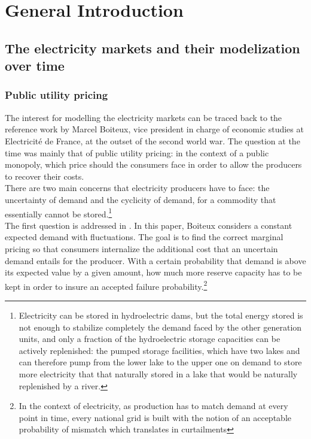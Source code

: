 \doublespacing
\section*{General Introduction}
\subsection*{The electricity markets and their modelization over time}
\subsubsection*{Public utility pricing}

The interest for modelling the electricity markets can be traced back to the reference work by Marcel Boiteux, vice president in charge of economic studies at Electricité de France, at the outset of the second world war. The question at the time was mainly that of public utility pricing: in the context of a public monopoly, which price should the consumers face in order to allow the producers to recover their costs. \\

There are two main concerns that electricity producers have to face: the uncertainty of demand and the cyclicity of demand, for a commodity that essentially cannot be stored.\footnote{Electricity can be stored in hydroelectric dams, but the total energy stored is not enough to stabilize completely the demand faced by the other generation units, and only a fraction of the hydroelectric storage capacities can be actively replenished: the pumped storage facilities, which have two lakes and can therefore pump from the lower lake to the upper one on demand to store more electricity that that naturally stored in a lake that would be naturally replenished by a river.} \\

The first question is addressed in \cite{boiteux1951tarification}. In this paper, Boiteux considers a constant expected demand with fluctuations. The goal is to find the correct marginal pricing so that consumers internalize the additional cost that an uncertain demand entails for the producer. With a certain probability that demand is above its expected value by a given amount, how much more reserve capacity has to be kept in order to insure an accepted failure probability.\footnote{In the context of electricity, as production has to match demand at every point in time, every national grid is built with the notion of an acceptable probability of mismatch which translates in curtailments}\\

